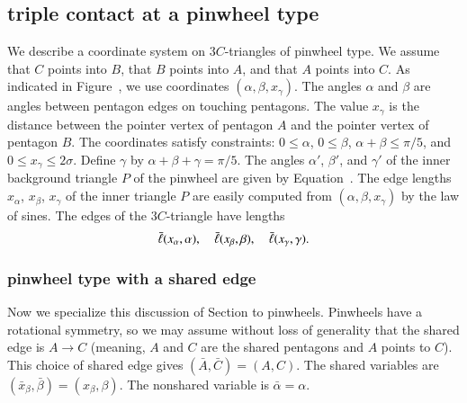 \subsection{triple contact at a pinwheel type}

We describe a coordinate system on $3C$-triangles of pinwheel type.
We assume that $C$ points into $B$, that $B$ points into $A$, and that
$A$ points into $C$.  As indicated in Figure~,
we use coordinates $(\alpha,\beta,x_\gamma)$.  The angles $\alpha$ and
$\beta$ are angles between pentagon edges on touching pentagons.  The
value $x_\gamma$ is the distance between the pointer vertex of
pentagon $A$ and the pointer vertex of pentagon $B$.  The coordinates
satisfy constraints: $0\le\alpha$, $0\le\beta$, $\alpha+\beta\le
\pi/5$, and $0\le x_\gamma\le 2\sigma$.  Define $\gamma$ by
$\alpha+\beta+\gamma=\pi/5$.  The angles $\alpha'$, $\beta'$, and
$\gamma'$ of the inner background triangle $P$ of the pinwheel are
given by Equation~.  The edge lengths $x_\alpha$,
$x_\beta$, $x_\gamma$ of the inner triangle $P$ are easily computed
from $(\alpha,\beta,x_\gamma)$ by the law of sines.  The edges of the
$3C$-triangle have lengths
\[
\bar\ell(x_\alpha,\alpha),\quad 
\bar\ell(x_\beta,\beta),\quad \bar\ell(x_\gamma,\gamma).
\]



\subsubsection{pinwheel type with a shared edge}

Now we specialize this discussion of Section  to
pinwheels.  Pinwheels have a rotational symmetry, so we may assume
without loss of generality that the shared edge is $A\to C$ (meaning,
$A$ and $C$ are the shared pentagons and $A$ points to $C$).  This
choice of shared edge gives $(\bar A,\bar C) = (A,C)$.  The shared
variables are $(\bar x_\beta,\bar\beta)=(x_\beta,\beta)$.  The
nonshared variable is $\bar\alpha=\alpha$.


